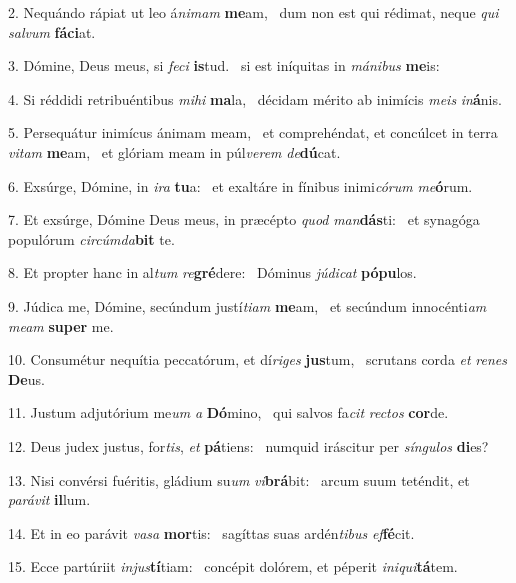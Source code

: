 2. Nequándo rápiat ut leo á\textit{ni}\textit{mam} \textbf{me}am, \ast\  dum non est qui rédimat, neque \textit{qui} \textit{sal}\textit{vum} \textbf{fá}\textbf{ci}at.\

3. Dómine, Deus meus, si \textit{fe}\textit{ci} \textbf{is}tud. \ast\  si est iníquitas in \textit{má}\textit{ni}\textit{bus} \textbf{me}is:\

4. Si réddidi retribuéntibus \textit{mi}\textit{hi} \textbf{ma}la, \ast\  décidam mérito ab inimícis \textit{me}\textit{is} \textit{in}\textbf{á}nis.\

5. Persequátur inimícus ánimam meam, \dag\  et comprehéndat, et concúlcet in terra \textit{vi}\textit{tam} \textbf{me}am, \ast\  et glóriam meam in púl\textit{ve}\textit{rem} \textit{de}\textbf{dú}cat.\

6. Exsúrge, Dómine, in \textit{i}\textit{ra} \textbf{tu}a: \ast\  et exaltáre in fínibus inimi\textit{có}\textit{rum} \textit{me}\textbf{ó}rum.\

7. Et exsúrge, Dómine Deus meus, in præcépto \textit{quod} \textit{man}\textbf{dás}ti: \ast\  et synagóga populórum \textit{cir}\textit{cúm}\textit{da}\textbf{bit} te.\

8. Et propter hanc in al\textit{tum} \textit{re}\textbf{gré}dere: \ast\  Dóminus \textit{jú}\textit{di}\textit{cat} \textbf{pó}\textbf{pu}los.\

9. Júdica me, Dómine, secúndum justí\textit{ti}\textit{am} \textbf{me}am, \ast\  et secúndum innocénti\textit{am} \textit{me}\textit{am} \textbf{su}\textbf{per} me.\

10. Consumétur nequítia peccatórum, et dí\textit{ri}\textit{ges} \textbf{jus}tum, \ast\  scrutans corda \textit{et} \textit{re}\textit{nes} \textbf{De}us.\

11. Justum adjutórium me\textit{um} \textit{a} \textbf{Dó}mino, \ast\  qui salvos fa\textit{cit} \textit{rec}\textit{tos} \textbf{cor}de.\

12. Deus judex justus, for\textit{tis}, \textit{et} \textbf{pá}tiens: \ast\  numquid iráscitur per \textit{sín}\textit{gu}\textit{los} \textbf{di}es?\

13. Nisi convérsi fuéritis, gládium su\textit{um} \textit{vi}\textbf{brá}bit: \ast\  arcum suum teténdit, et \textit{pa}\textit{rá}\textit{vit} \textbf{il}lum.\

14. Et in eo parávit \textit{va}\textit{sa} \textbf{mor}tis: \ast\  sagíttas suas ardén\textit{ti}\textit{bus} \textit{ef}\textbf{fé}cit.\

15. Ecce partúriit \textit{in}\textit{jus}\textbf{tí}tiam: \ast\  concépit dolórem, et péperit \textit{in}\textit{i}\textit{qui}\textbf{tá}tem.\

